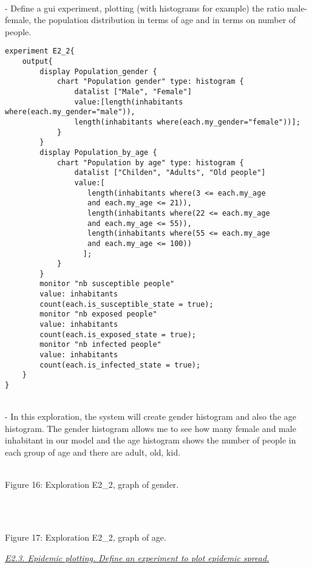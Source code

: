 \documentclass{article}
\begin{document}
\begin{pic15}
\begin{pic15}
\\- Define a gui experiment, plotting (with histograms for example) the ratio male-female, the population distribution in terms of age and in terms on number of people.
\newline\newline
\begin{tcolorbox}
\begin{lstlisting}
experiment E2_2{
	output{
		display Population_gender {
			chart "Population gender" type: histogram {
				datalist ["Male", "Female"] 
				value:[length(inhabitants where(each.my_gender="male")), 
				length(inhabitants where(each.my_gender="female"))];
			}								
		}
		display Population_by_age {
			chart "Population by age" type: histogram {
				datalist ["Childen", "Adults", "Old people"] 
				value:[
				   length(inhabitants where(3 <= each.my_age 
				   and each.my_age <= 21)),
				   length(inhabitants where(22 <= each.my_age 
				   and each.my_age <= 55)), 
				   length(inhabitants where(55 <= each.my_age 
				   and each.my_age <= 100))
				  ];
			}
		}
		monitor "nb susceptible people" 
		value: inhabitants 
		count(each.is_susceptible_state = true);
		monitor "nb exposed people" 
		value: inhabitants 
		count(each.is_exposed_state = true);
		monitor "nb infected people" 
		value: inhabitants 
		count(each.is_infected_state = true);
	}
}
\end{lstlisting}
\end{tcolorbox}
\newpage
\\- In this exploration, the system will create gender histogram and also the age histogram. The gender histogram allows me to see how many female and male inhabitant in our model and the age histogram shows the number of people in each group of age and there are adult, old, kid.
\\
\begin{pic16}
\\
\caption{Figure 16: Exploration E2\_2, graph of gender.} 
\end{pic16}
\\
\begin{pic17}
\\
\caption{Figure 17: Exploration E2\_2, graph of age.} 
\end{pic17}
\newpage
\underline{\textit{E2.3. Epidemic plotting. Define an experiment to plot epidemic spread.}}
\begin{tcolorbox}

\end{tcolorbox}
\end{pic15}
\end{pic15}
\end{document}
